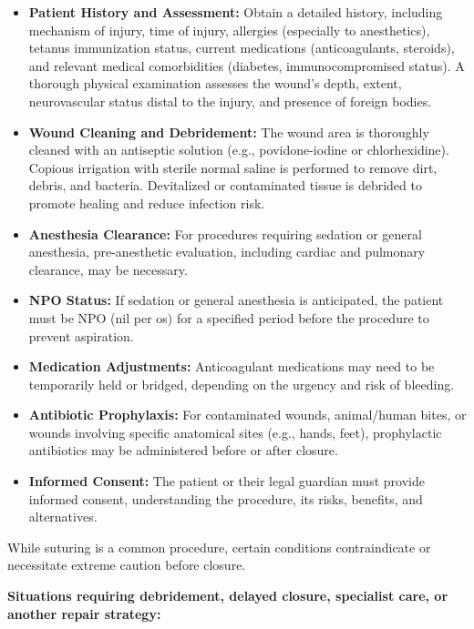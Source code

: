 \begin{itemize}
  \item \textbf{Patient History and Assessment:} Obtain a detailed history, including mechanism of injury, time of injury, allergies (especially to anesthetics), tetanus immunization status, current medications (anticoagulants, steroids), and relevant medical comorbidities (diabetes, immunocompromised status). A thorough physical examination assesses the wound's depth, extent, neurovascular status distal to the injury, and presence of foreign bodies.
  
  \item \textbf{Wound Cleaning and Debridement:} The wound area is thoroughly cleaned with an antiseptic solution (e.g., povidone-iodine or chlorhexidine). Copious irrigation with sterile normal saline is performed to remove dirt, debris, and bacteria. Devitalized or contaminated tissue is debrided to promote healing and reduce infection risk.
  
  \item \textbf{Anesthesia Clearance:} For procedures requiring sedation or general anesthesia, pre-anesthetic evaluation, including cardiac and pulmonary clearance, may be necessary.
  
  \item \textbf{NPO Status:} If sedation or general anesthesia is anticipated, the patient must be NPO (nil per os) for a specified period before the procedure to prevent aspiration.
  
  \item \textbf{Medication Adjustments:} Anticoagulant medications may need to be temporarily held or bridged, depending on the urgency and risk of bleeding.
  
  \item \textbf{Antibiotic Prophylaxis:} For contaminated wounds, animal/human bites, or wounds involving specific anatomical sites (e.g., hands, feet), prophylactic antibiotics may be administered before or after closure.
  
  \item \textbf{Informed Consent:} The patient or their legal guardian must provide informed consent, understanding the procedure, its risks, benefits, and alternatives.
\end{itemize}

While suturing is a common procedure, certain conditions contraindicate or necessitate extreme caution before closure.

\textbf{Situations requiring debridement, delayed closure, specialist care, or another repair strategy:}

